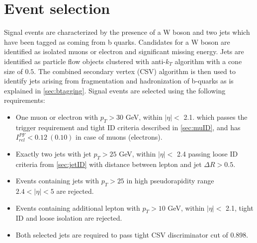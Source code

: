 \section{Event selection}
\label{sec:selection}
Signal events are characterized by the presence of a W boson and two jets which have been tagged as coming from b quarks. 
Candidates for a W boson are identified as isolated muons or electron and significant missing energy. 
Jets are identified as particle flow objects clustered with anti-$k_T$ algorithm with a cone size of $0.5$.
The combined secondary vertex (CSV) algorithm is then used to identify jets arising from fragmentation and hadronization of b-quarks as is explained in \ref{sec:btagging}. Signal events are selected using the following requirements:
\begin{itemize}
\item One muon or electron with $p_T>30$ GeV, within $|\eta|<$ 2.1. which passes the trigger requirement and tight ID criteria described in \ref{sec:muID}, and has $I_{rel}^{PF}<0.12\ (0.10)$ in case of muons (electrons).
\item Exactly two jets with jet $p_T>25$ GeV, within $|\eta|<$ 2.4 passing loose ID criteria from \ref{sec:jetID} with distance between lepton and jet $\Delta R>0.5$. 
\item Events containing jets with $p_T>25$ in high pseudorapidity range $2.4<|\eta|<5$ are rejected.
\item Events containing additional lepton with $p_T>10$ GeV, within $|\eta|<$ 2.1, tight ID and loose isolation are rejected.
\item Both selected jets are required to pass tight CSV discriminator cut of 0.898.
\end{itemize} 

